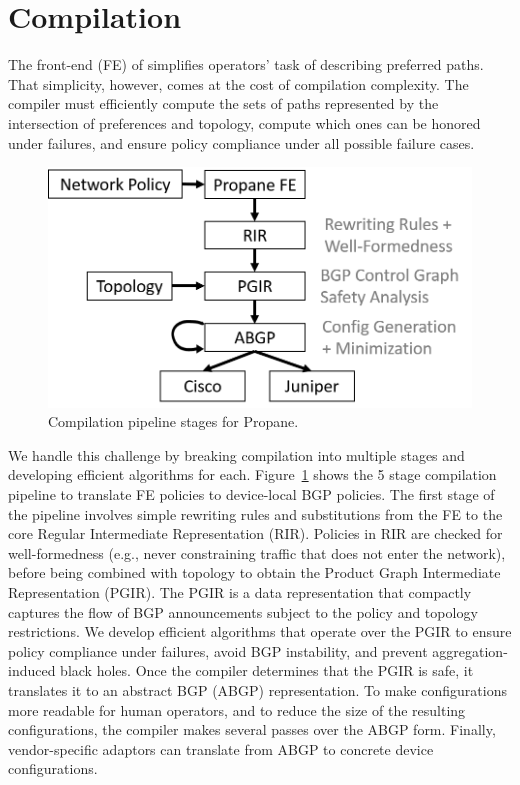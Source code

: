 \section{Compilation}
\label{sec:compilation}

The front-end (FE) of \sysname simplifies operators' task of describing preferred paths. That simplicity, however, comes at the cost of compilation complexity. The compiler must efficiently compute the sets of paths represented by the intersection of preferences and topology, compute which ones can be honored under failures, and ensure policy compliance under all possible failure cases.



\begin{figure}[t!]
\centering
\includegraphics[width=.75\columnwidth]{figures/pipeline}
\caption{Compilation pipeline stages for Propane.}
\label{fig:pipeline}
\end{figure}


We handle this challenge by breaking compilation into multiple stages and developing efficient algorithms for each.
Figure~\ref{fig:pipeline} shows the 5 stage compilation pipeline to translate \sysname FE policies to device-local BGP policies. The first stage of the pipeline involves simple rewriting rules and substitutions from the FE to the core Regular Intermediate Representation (RIR). Policies in RIR are checked for well-formedness (e.g., never constraining traffic that does not enter the network), before being combined with topology to obtain the Product Graph Intermediate Representation (PGIR). The PGIR is a data representation that compactly captures the flow of BGP announcements subject to the policy and topology restrictions. We develop efficient algorithms that operate over the PGIR to ensure policy compliance under failures, avoid BGP instability, and prevent aggregation-induced black holes. Once the compiler determines that the PGIR is safe, it translates it to an abstract BGP (ABGP) representation. To make configurations more readable for human operators, and to reduce the size of the resulting configurations, the \sysname compiler makes several passes over the ABGP form. Finally, vendor-specific adaptors can translate from ABGP to concrete device configurations.


